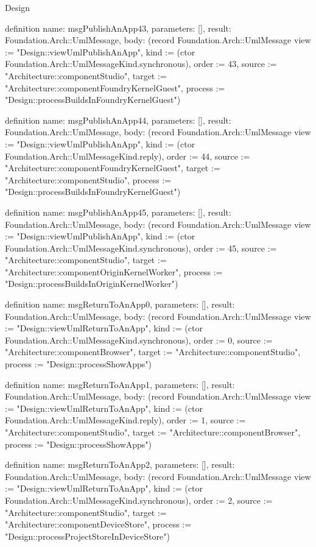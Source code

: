 \begin{lexlean}{Design}
\begin{semanticmodule}
definition{
  name: msgPublishAnApp43,
  parameters: [],
  result: Foundation.Arch::UmlMessage,
  body: (record Foundation.Arch::UmlMessage {view := "Design::viewUmlPublishAnApp", kind := (ctor Foundation.Arch::UmlMessageKind.synchronous), order := 43, source := "Architecture::componentStudio", target := "Architecture::componentFoundryKernelGuest", process := "Design::processBuildsInFoundryKernelGuest"})
}

definition{
  name: msgPublishAnApp44,
  parameters: [],
  result: Foundation.Arch::UmlMessage,
  body: (record Foundation.Arch::UmlMessage {view := "Design::viewUmlPublishAnApp", kind := (ctor Foundation.Arch::UmlMessageKind.reply), order := 44, source := "Architecture::componentFoundryKernelGuest", target := "Architecture::componentStudio", process := "Design::processBuildsInFoundryKernelGuest"})
}

definition{
  name: msgPublishAnApp45,
  parameters: [],
  result: Foundation.Arch::UmlMessage,
  body: (record Foundation.Arch::UmlMessage {view := "Design::viewUmlPublishAnApp", kind := (ctor Foundation.Arch::UmlMessageKind.synchronous), order := 45, source := "Architecture::componentStudio", target := "Architecture::componentOriginKernelWorker", process := "Design::processBuildsInOriginKernelWorker"})
}

definition{
  name: msgReturnToAnApp0,
  parameters: [],
  result: Foundation.Arch::UmlMessage,
  body: (record Foundation.Arch::UmlMessage {view := "Design::viewUmlReturnToAnApp", kind := (ctor Foundation.Arch::UmlMessageKind.synchronous), order := 0, source := "Architecture::componentBrowser", target := "Architecture::componentStudio", process := "Design::processShowApps"})
}

definition{
  name: msgReturnToAnApp1,
  parameters: [],
  result: Foundation.Arch::UmlMessage,
  body: (record Foundation.Arch::UmlMessage {view := "Design::viewUmlReturnToAnApp", kind := (ctor Foundation.Arch::UmlMessageKind.reply), order := 1, source := "Architecture::componentStudio", target := "Architecture::componentBrowser", process := "Design::processShowApps"})
}

definition{
  name: msgReturnToAnApp2,
  parameters: [],
  result: Foundation.Arch::UmlMessage,
  body: (record Foundation.Arch::UmlMessage {view := "Design::viewUmlReturnToAnApp", kind := (ctor Foundation.Arch::UmlMessageKind.synchronous), order := 2, source := "Architecture::componentStudio", target := "Architecture::componentDeviceStore", process := "Design::processProjectStoreInDeviceStore"})
}


\end{semanticmodule}
\end{lexlean}
